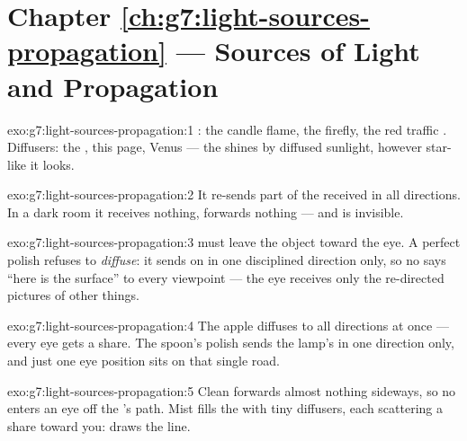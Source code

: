 \section*{Chapter \ref{ch:g7:light-sources-propagation} --- Sources of Light and Propagation}

\begin{solution}{exo:g7:light-sources-propagation:1}
: the candle flame, the firefly, the red traffic
. Diffusers: the , this page, Venus --- the 
shines by diffused sunlight, however star-like it looks.
\end{solution}

\begin{solution}{exo:g7:light-sources-propagation:2}
It re-sends part of the received  in all directions. In a
dark room it receives nothing, forwards nothing --- and is
invisible.
\end{solution}

\begin{solution}{exo:g7:light-sources-propagation:3}
 must leave the object toward the eye. A perfect polish
refuses to \emph{diffuse}: it sends  on in one disciplined
direction only, so no  says ``here is the surface'' to every
viewpoint --- the eye receives only the re-directed pictures of
other things.
\end{solution}

\begin{solution}{exo:g7:light-sources-propagation:4}
The apple diffuses to all directions at once --- every eye gets a
share. The spoon's polish sends the lamp's  in one direction
only, and just one eye position sits on that single road.
\end{solution}

\begin{solution}{exo:g7:light-sources-propagation:5}
Clean  forwards almost nothing sideways, so no 
enters an eye off the 's path. Mist fills the  with tiny
diffusers, each scattering a share toward you:  draws
the line.
\end{solution}

